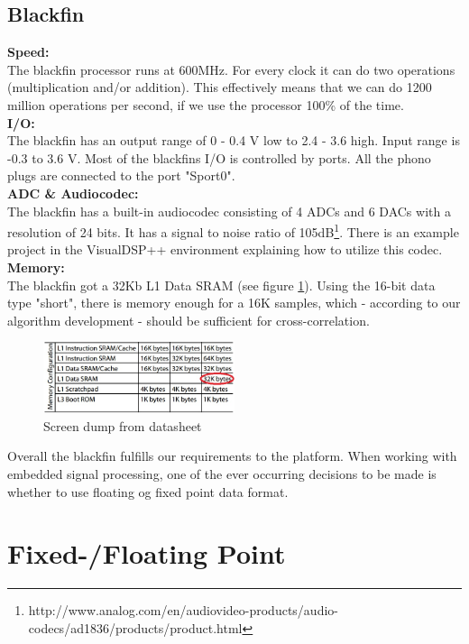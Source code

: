 \subsection{Blackfin}
\textbf{Speed:}\\
The blackfin processor runs at 600MHz. For every clock it can do two operations (multiplication and/or addition). This effectively means that we can do 1200 million operations per second, if we use the processor 100\% of the time.\\
\textbf{I/O:}\\
The blackfin has an output range of 0 - 0.4 V low to 2.4 - 3.6 high. Input range is -0.3 to 3.6 V. Most of the blackfins I/O is controlled by ports. All the phono plugs are connected to the port "Sport0". \\
\textbf{ADC \& Audiocodec:}\\
The blackfin has a built-in audiocodec consisting of 4 ADCs and 6 DACs with a resolution of 24 bits. It has a signal to noise ratio of 105dB\footnote{http://www.analog.com/en/audiovideo-products/audio-codecs/ad1836/products/product.html}. There is an example project in the VisualDSP++ environment explaining how to utilize this codec.\\
\textbf{Memory:}\\
The blackfin got a 32Kb L1 Data SRAM (see figure \ref{img:mem_table}). Using the 16-bit data type "short", there is memory enough for a 16K samples, which - according to our algorithm development - should be sufficient for cross-correlation.
\begin{figure}[hbpt]
\centering
\includegraphics[width=0.5\textwidth]{billeder/memorytable}
\caption[Screen dump from datasheet]{Screen dump from datasheet\footnotemark}
\label{img:mem_table}
\end{figure}

Overall the blackfin fulfills our requirements to the platform. 
When working with embedded signal processing, one of the ever occurring decisions to be made is whether to use floating og fixed point data format. 

\section{Fixed-/Floating Point}
